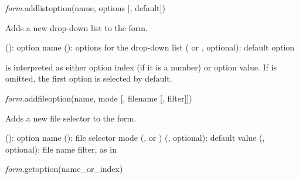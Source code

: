 \documentclass[a4paper,12pt,twoside,extrafontsizes]{memoir}
\begin{document}

\begin{luafuncprototype}
	\emph{form}.addlistoption(name, options [, default])
\end{luafuncprototype}

\begin{funcdescr}
	Adds a new drop-down list to the form.
\end{funcdescr}

\begin{funcparams}
	 (): option name
	 (): options for the drop-down list
	 ( or , optional): default option
\end{funcparams}

\begin{funcremarks}
	 is interpreted as either option index (if it is a number) or option value. If  is omitted, the first option is selected by default.
\end{funcremarks}


\begin{luafuncprototype}
	\emph{form}.addfileoption(name, mode [, filename [, filter]])
\end{luafuncprototype}

\begin{funcdescr}
	Adds a new file selector to the form.
\end{funcdescr}

\begin{funcparams}
	 (): option name
	 (): file selector mode (,  or )
	 (, optional): default value
	 (, optional): file name filter, as in 
\end{funcparams}


\begin{luafuncprototype}
\emph{form}.getoption(name\_or\_index)
\end{luafuncprototype}
\end{document}
